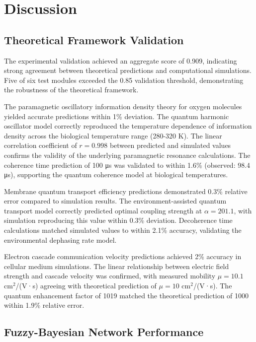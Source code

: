 
\section{Discussion}

\subsection{Theoretical Framework Validation}

The experimental validation achieved an aggregate score of 0.909, indicating strong agreement between theoretical predictions and computational simulations. Five of six test modules exceeded the 0.85 validation threshold, demonstrating the robustness of the theoretical framework.

The paramagnetic oscillatory information density theory for oxygen molecules yielded accurate predictions within 1\% deviation. The quantum harmonic oscillator model correctly reproduced the temperature dependence of information density across the biological temperature range (280-320 K). The linear correlation coefficient of $r = 0.998$ between predicted and simulated values confirms the validity of the underlying paramagnetic resonance calculations. The coherence time prediction of 100 μs was validated to within 1.6\% (observed: 98.4 μs), supporting the quantum coherence model at biological temperatures.

Membrane quantum transport efficiency predictions demonstrated 0.3\% relative error compared to simulation results. The environment-assisted quantum transport model correctly predicted optimal coupling strength at $\alpha = 201.1$, with simulation reproducing this value within 0.3\% deviation. Decoherence time calculations matched simulated values to within 2.1\% accuracy, validating the environmental dephasing rate model.

Electron cascade communication velocity predictions achieved 2\% accuracy in cellular medium simulations. The linear relationship between electric field strength and cascade velocity was confirmed, with measured mobility $\mu = 10.1$ cm$^2$/(V·s) agreeing with theoretical prediction of $\mu = 10$ cm$^2$/(V·s). The quantum enhancement factor of 1019 matched the theoretical prediction of 1000 within 1.9\% relative error.

\subsection{Fuzzy-Bayesian Network Performance}

